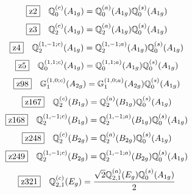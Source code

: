 \documentclass[fleqn,10pt,landscape]{jsarticle}
\begin{document}
\begin{dmath*}
\hspace*{3mm}\fbox{z2}\quad \mathbb{Q}_{0}^{(c)}(A_{1g})=\mathbb{Q}_{0}^{(a)}(A_{1g}) \mathbb{Q}_{0}^{(s)}(A_{1g})
\end{dmath*}
\begin{dmath*}
\hspace*{3mm}\fbox{z3}\quad \mathbb{Q}_{2}^{(c)}(A_{1g})=\mathbb{Q}_{2}^{(a)}(A_{1g}) \mathbb{Q}_{0}^{(s)}(A_{1g})
\end{dmath*}
\begin{dmath*}
\hspace*{3mm}\fbox{z4}\quad \mathbb{Q}_{2}^{(1,-1;c)}(A_{1g})=\mathbb{Q}_{2}^{(1,-1;a)}(A_{1g}) \mathbb{Q}_{0}^{(s)}(A_{1g})
\end{dmath*}
\begin{dmath*}
\hspace*{3mm}\fbox{z5}\quad \mathbb{Q}_{0}^{(1,1;c)}(A_{1g})=\mathbb{Q}_{0}^{(1,1;a)}(A_{1g}) \mathbb{Q}_{0}^{(s)}(A_{1g})
\end{dmath*}
\begin{dmath*}
\hspace*{3mm}\fbox{z98}\quad \mathbb{G}_{1}^{(1,0;c)}(A_{2g})=\mathbb{G}_{1}^{(1,0;a)}(A_{2g}) \mathbb{Q}_{0}^{(s)}(A_{1g})
\end{dmath*}
\begin{dmath*}
\hspace*{3mm}\fbox{z167}\quad \mathbb{Q}_{2}^{(c)}(B_{1g})=\mathbb{Q}_{2}^{(a)}(B_{1g}) \mathbb{Q}_{0}^{(s)}(A_{1g})
\end{dmath*}
\begin{dmath*}
\hspace*{3mm}\fbox{z168}\quad \mathbb{Q}_{2}^{(1,-1;c)}(B_{1g})=\mathbb{Q}_{2}^{(1,-1;a)}(B_{1g}) \mathbb{Q}_{0}^{(s)}(A_{1g})
\end{dmath*}
\begin{dmath*}
\hspace*{3mm}\fbox{z248}\quad \mathbb{Q}_{2}^{(c)}(B_{2g})=\mathbb{Q}_{2}^{(a)}(B_{2g}) \mathbb{Q}_{0}^{(s)}(A_{1g})
\end{dmath*}
\begin{dmath*}
\hspace*{3mm}\fbox{z249}\quad \mathbb{Q}_{2}^{(1,-1;c)}(B_{2g})=\mathbb{Q}_{2}^{(1,-1;a)}(B_{2g}) \mathbb{Q}_{0}^{(s)}(A_{1g})
\end{dmath*}
\begin{dmath*}
\hspace*{3mm}\fbox{z321}\quad \mathbb{Q}_{2,1}^{(c)}(E_{g})=\frac{\sqrt{2} \mathbb{Q}_{2,1}^{(a)}(E_{g}) \mathbb{Q}_{0}^{(s)}(A_{1g})}{2}
\end{dmath*}
\end{document}

